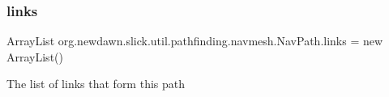 \subsubsection{\texorpdfstring{links}{links}}
{\footnotesize\ttfamily Array\+List org.\+newdawn.\+slick.\+util.\+pathfinding.\+navmesh.\+Nav\+Path.\+links = new Array\+List()\hspace{0.3cm}{\ttfamily [private]}}

The list of links that form this path 